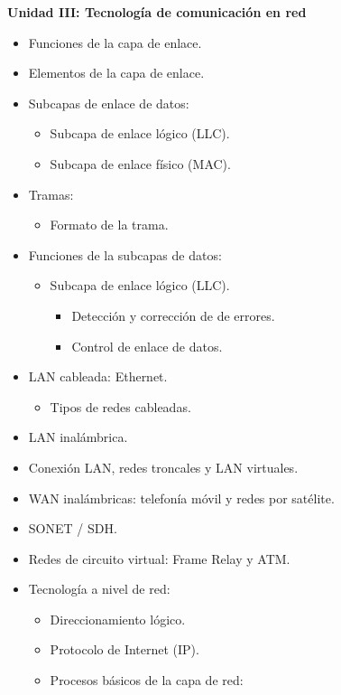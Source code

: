 \textbf{Unidad III: Tecnología de comunicación en red}
\begin{itemize}
	\item Funciones de la capa de enlace.
	\item Elementos de la capa de enlace.
	\item Subcapas de enlace de datos:
	      \begin{itemize}
		      \item Subcapa de enlace lógico (LLC).
		      \item Subcapa de enlace físico (MAC).
	      \end{itemize}
	\item Tramas:
	      \begin{itemize}
		      \item Formato de la trama.
	      \end{itemize}
	\item Funciones de la subcapas de datos:
	      \begin{itemize}
		      \item Subcapa de enlace lógico (LLC).
		            \begin{itemize}
			            \item Detección y corrección de de errores.
			            \item Control de enlace de datos.
		            \end{itemize}
	      \end{itemize}
	\item LAN cableada: Ethernet.
	      \begin{itemize}
		      \item Tipos de redes cableadas.
	      \end{itemize}
	\item LAN inalámbrica.
	\item Conexión LAN, redes troncales y LAN virtuales.
	\item WAN inalámbricas: telefonía móvil y redes por satélite.
	\item SONET / SDH.
	\item Redes de circuito virtual: Frame Relay y ATM.
	\item Tecnología a nivel de red:
	      \begin{itemize}
		      \item Direccionamiento lógico.
		      \item Protocolo de Internet (IP).
		      \item Procesos básicos de la capa de red:
		            \begin{itemize}

\end{itemize}
\end{itemize}
\end{itemize}
